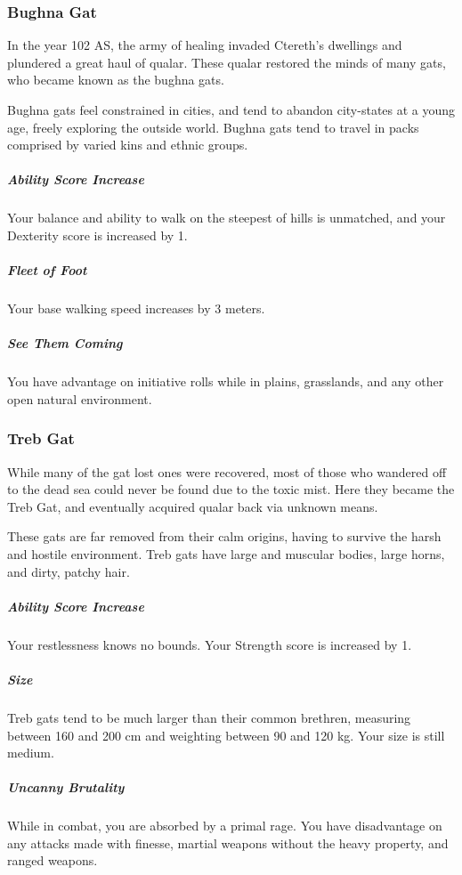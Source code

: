 \begin{linenumbers}
\subsubsection{Bughna Gat}
In the year 102 AS, the army of healing invaded Ctereth's dwellings and plundered a great haul of qualar.
These qualar restored the minds of many gats, who became known as the bughna gats.

Bughna gats feel constrained in cities, and tend to abandon city-states at a young age, freely exploring the outside world.
Bughna gats tend to travel in packs comprised by varied kins and ethnic groups.

\subparagraph{Ability Score Increase} Your balance and ability to walk on the steepest of hills is unmatched, and your Dexterity score is increased by 1.

\subparagraph{Fleet of Foot} Your base walking speed increases by 3 meters.

\subparagraph{See Them Coming} You have advantage on initiative rolls while in plains, grasslands, and any other open natural environment.

\subsubsection{Treb Gat}
While many of the gat lost ones were recovered, most of those who wandered off to the dead sea could never be found due to the toxic mist.
Here they became the Treb Gat, and eventually acquired qualar back via unknown means.

These gats are far removed from their calm origins, having to survive the harsh and hostile environment.
Treb gats have large and muscular bodies, large horns, and dirty, patchy hair.

\subparagraph{Ability Score Increase} Your restlessness knows no bounds.
Your Strength score is increased by 1.

\subparagraph{Size} Treb gats tend to be much larger than their common brethren, measuring between 160 and 200 cm and weighting between 90 and 120 kg.
Your size is still medium.

\subparagraph{Uncanny Brutality} While in combat, you are absorbed by a primal rage.
You have disadvantage on any attacks made with finesse, martial weapons without the heavy property, and ranged weapons.


\end{linenumbers}
